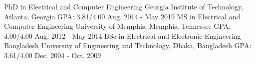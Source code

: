 \begin{cventries}
\cventry
    {PhD in Electrical and Computer Engineering}
    {Georgia Institute of Technology, Atlanta, Georgia}
    {GPA: 3.81/4.00}
    {Aug. 2014 - May 2019}
  \cventry
    {MS in Electrical and Computer Engineering}
    {University of Memphis, Memphis, Tennessee}
    {GPA: 4.00/4.00}
    {Aug. 2012 - May 2014}
  \cventry
    {BSc in Electrical and Electronic Engineering}
    {Bangladesh University of Engineering and Technology, Dhaka, Bangladesh}
    {GPA: 3.61/4.00}
    {Dec. 2004 - Oct. 2009}
\end{cventries}
